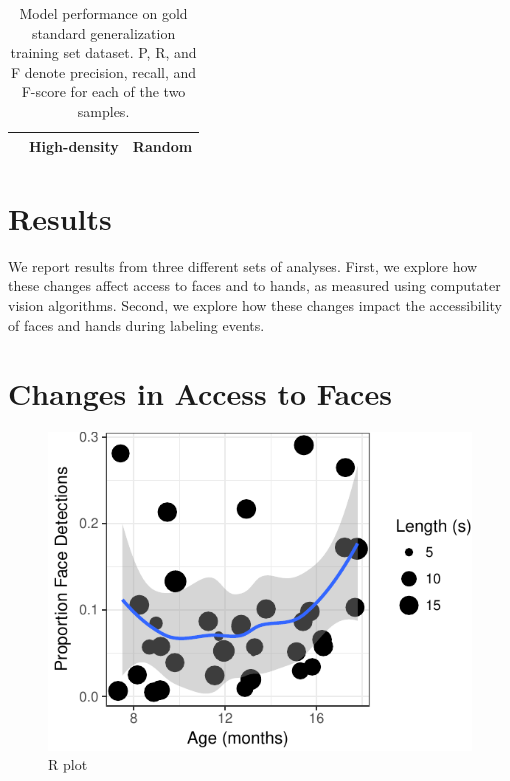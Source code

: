 \documentclass[10pt, letterpaper]{article}
\newenvironment{CodeChunk}{}{}
\begin{document}
\begin{table}[t]
  \caption{Model performance on gold standard generalization training set dataset. P, R, and F denote precision, recall, and F-score for each of the two samples. \label{tab:model_eval}}
  \begin{center}
    \begin{tabular}{l|ccc|ccc}
      \hline
       &  \multicolumn{3}{c|}{High-density} &  \multicolumn{3}{c}{Random} \\
      \hline
    \hline
    \end{tabular}
  \end{center}
\end{table}

\section{Results}\label{results}

We report results from three different sets of analyses. First, we
explore how these changes affect access to faces and to hands, as
measured using computater vision algorithms. Second, we explore how
these changes impact the accessibility of faces and hands during
labeling events.

\section{Changes in Access to Faces}\label{changes-in-access-to-faces}

\begin{CodeChunk}
\begin{figure}[H]

{\centering \includegraphics{figs/unnamed-chunk-3-1} 

}

\caption[R plot]{R plot}\label{fig:unnamed-chunk-3}
\end{figure}
\end{CodeChunk}
\end{document}
